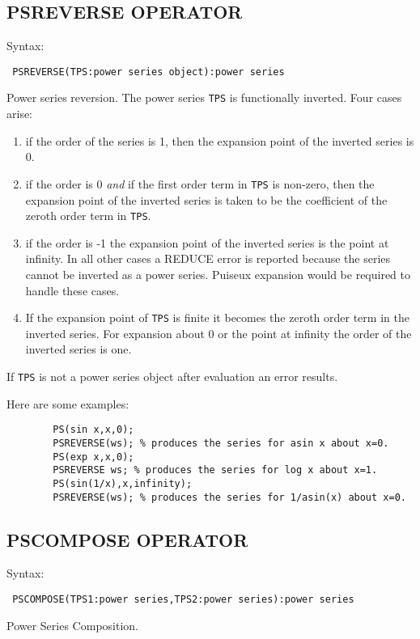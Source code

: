 \subsection*{PSREVERSE OPERATOR}

Syntax:
\begin{verbatim}
 PSREVERSE(TPS:power series object):power series
\end{verbatim}
Power series reversion.  The power series {\tt TPS} is functionally
inverted.  Four cases arise:
\begin{enumerate}
\item if the order of the series is 1, then the expansion point of the
inverted series is 0. 

\item if the order is 0 {\em and} if the first order term in {\tt TPS}
is non-zero, then the expansion point of the inverted series is taken
to be the coefficient of the zeroth order term in {\tt TPS}.

\item if the order is -1 the expansion point of the inverted series
is the point at infinity.  In all other cases a REDUCE error is
reported because the series cannot be inverted as a power series. Puiseux
expansion would be required to handle these cases.

\item If the expansion point of {\tt TPS} is finite it becomes the
zeroth order term in the inverted series. For expansion about 0 or the
point at infinity the order of the inverted series is one.
\end{enumerate}
If {\tt TPS} is not a power series object after evaluation an error results.

\noindent Here are some examples:
\begin{verbatim}
        PS(sin x,x,0);
        PSREVERSE(ws); % produces the series for asin x about x=0.
        PS(exp x,x,0);
        PSREVERSE ws; % produces the series for log x about x=1.
        PS(sin(1/x),x,infinity);
        PSREVERSE(ws); % produces the series for 1/asin(x) about x=0.
\end{verbatim}

\subsection*{PSCOMPOSE OPERATOR}

Syntax:
\begin{verbatim}
 PSCOMPOSE(TPS1:power series,TPS2:power series):power series
\end{verbatim}
Power Series Composition.

